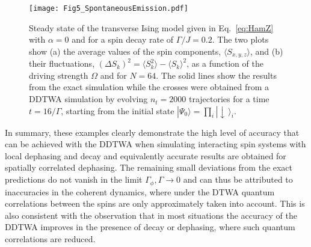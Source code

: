\documentclass[pra,twocolumn,showpacs,preprintnumbers,amsmath,amssymb,superscriptaddress]{revtex4-1}
\newcommand{\erw}[1]{\langle#1\rangle}
\begin{document}




\begin{figure}[t]
	\centering
	\texttt{[image: Fig5\_SpontaneousEmission.pdf]}
	\caption{Steady state of the transverse Ising model given in Eq.~\eqref{eq:HamZ} with $\alpha=0$ and for a spin decay rate of $\Gamma/J=0.2$. The two plots show (a) the average values of the spin components, $\erw{S_{x,y,z}}$, and (b) their fluctuations, $(\Delta S_{k})^2=\langle S_k^2\rangle - \langle S_k\rangle^2$, as a function of the driving strength $\Omega$ and for $N=64$. The solid lines show the results from the exact simulation while the crosses were obtained from a DDTWA simulation by evolving $n_t=2000$ trajectories for a time $t=16/\Gamma$, starting from the initial state $|\Psi_0\rangle=\prod_i |\downarrow\,\rangle_i$.}
	\label{fig:TransverseIsingSSspontenousEmission}
\end{figure}

In summary, these examples clearly demonstrate the high level of accuracy that can be achieved with the DDTWA when simulating interacting spin systems with local dephasing and decay and equivalently accurate results are obtained for spatially correlated dephasing. The remaining small deviations from the exact predictions do not vanish in the limit $\Gamma_\phi,\Gamma\rightarrow 0$ and can thus be attributed to inaccuracies in the coherent dynamics, where under the DTWA quantum correlations between the spins are only approximately taken into account. This is also consistent with the observation that in most situations the accuracy of the DDTWA  improves in the presence of decay or dephasing, where such quantum correlations are reduced.
\end{document}
